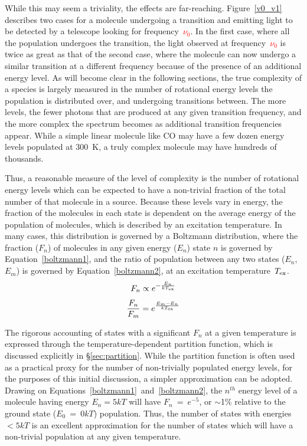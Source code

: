 \documentclass[twocolumn]{aastex631}
\begin{document}
While this may seem a triviality, the effects are far-reaching.  Figure~\ref{v0_v1} describes two cases for a molecule undergoing a transition and emitting light to be detected by a telescope looking for frequency~\textcolor{red}{$\nu_0$}.  In the first case, where all the population undergoes the transition, the light observed at frequency~\textcolor{red}{$\nu_0$} is twice as great as that of the second case, where the molecule can now undergo a similar transition at a different frequency because of the presence of an additional energy level.  As will become clear in the following sections, the true complexity of a species is largely measured in the number of rotational energy levels the population is distributed over, and undergoing transitions between.  The more levels, the fewer photons that are produced at any given transition frequency, and the more complex the spectrum becomes as additional transition frequencies appear.  While a simple linear molecule like CO may have a few dozen energy levels populated at 300~K, a truly complex molecule may have hundreds of thousands.

Thus, a reasonable measure of the level of complexity is the number of rotational energy levels which can be expected to have a non-trivial fraction of the total number of that molecule in a source.  Because these levels vary in energy, the fraction of the molecules in each state is dependent on the average energy of the population of molecules, which is described by an excitation temperature.  In many cases, this distribution is governed by a Boltzmann distribution, where the fraction ($F_n$) of molecules in any given energy ($E_n$) state $n$ is governed by Equation~\ref{boltzmann1}, and the ratio of population between any two states ($E_n$,~$E_m$) is governed by Equation~\ref{boltzmann2}, at an excitation temperature~$T_{\rm{ex}}$.
\begin{equation}
F_n \propto e^{-\frac{E_n}{kT_{\rm{ex}}}}
\label{boltzmann1}
\end{equation}
\begin{equation}
\frac{F_n}{F_m} = e^{\frac{E_m - E_n}{kT_{\rm{ex}}}}
\label{boltzmann2}
\end{equation}

The rigorous accounting of states with a significant $F_n$ at a given temperature is expressed through the temperature-dependent partition function, which is discussed explicitly in \S\ref{sec:partition}.  While the partition function is often used as a practical proxy for the number of non-trivially populated energy levels, for the purposes of this initial discussion, a simpler approximation can be adopted.  Drawing on Equations~\ref{boltzmann1}~and~\ref{boltzmann2}, the $n^{th}$ energy level of a molecule having energy $E_n = 5kT$ will have $F_n$~=~$e^{-5}$, or $\sim$1\% relative to the ground state ($E_0$~=~$0kT$) population.  Thus, the number of states with energies $<5kT$ is an excellent approximation for the number of states which will have a non-trivial population at any given temperature.  
\end{document}
